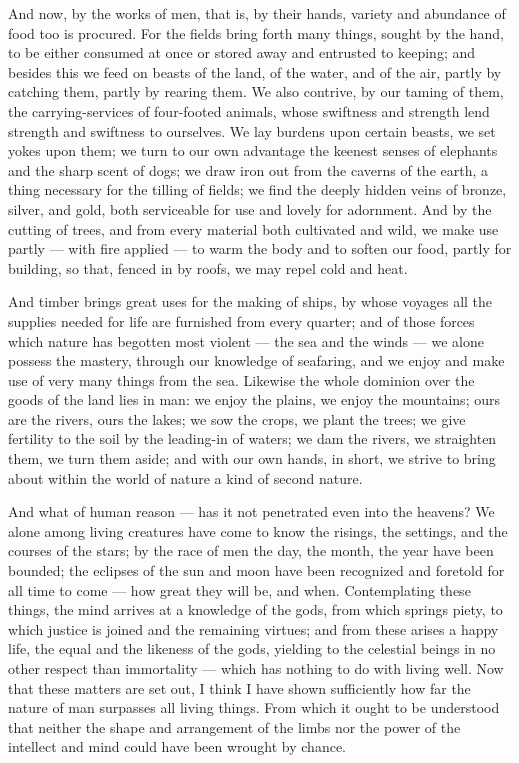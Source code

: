  And now, by the works of men, that is, by their hands, variety and abundance of food too is procured. For the fields bring forth many things, sought by the hand, to be either consumed at once or stored away and entrusted to keeping; and besides this we feed on beasts of the land, of the water, and of the air, partly by catching them, partly by rearing them. We also contrive, by our taming of them, the carrying-services of four-footed animals, whose swiftness and strength lend strength and swiftness to ourselves. We lay burdens upon certain beasts, we set yokes upon them; we turn to our own advantage the keenest senses of elephants and the sharp scent of dogs; we draw iron out from the caverns of the earth, a thing necessary for the tilling of fields; we find the deeply hidden veins of bronze, silver, and gold, both serviceable for use and lovely for adornment. And by the cutting of trees, and from every material both cultivated and wild, we make use partly — with fire applied — to warm the body and to soften our food, partly for building, so that, fenced in by roofs, we may repel cold and heat.

 And timber brings great uses for the making of ships, by whose voyages all the supplies needed for life are furnished from every quarter; and of those forces which nature has begotten most violent — the sea and the winds — we alone possess the mastery, through our knowledge of seafaring, and we enjoy and make use of very many things from the sea. Likewise the whole dominion over the goods of the land lies in man: we enjoy the plains, we enjoy the mountains; ours are the rivers, ours the lakes; we sow the crops, we plant the trees; we give fertility to the soil by the leading-in of waters; we dam the rivers, we straighten them, we turn them aside; and with our own hands, in short, we strive to bring about within the world of nature a kind of second nature.

 And what of human reason — has it not penetrated even into the heavens? We alone among living creatures have come to know the risings, the settings, and the courses of the stars; by the race of men the day, the month, the year have been bounded; the eclipses of the sun and moon have been recognized and foretold for all time to come — how great they will be, and when. Contemplating these things, the mind arrives at a knowledge of the gods, from which springs piety, to which justice is joined and the remaining virtues; and from these arises a happy life, the equal and the likeness of the gods, yielding to the celestial beings in no other respect than immortality — which has nothing to do with living well. Now that these matters are set out, I think I have shown sufficiently how far the nature of man surpasses all living things. From which it ought to be understood that neither the shape and arrangement of the limbs nor the power of the intellect and mind could have been wrought by chance.

